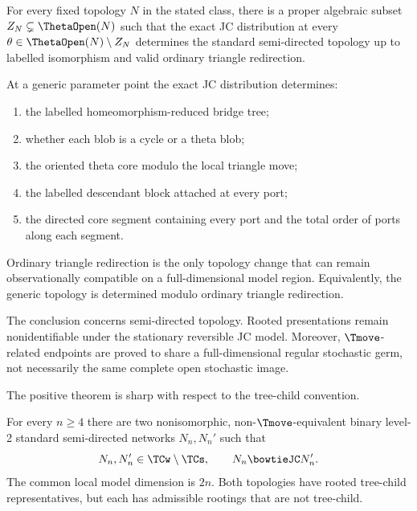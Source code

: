 \begin{corollary}\label{cor:generic-identifiability}
For every fixed topology $N$ in the stated class, there is a proper algebraic subset $Z_N\subsetneq\ThetaOpen(N)$ such that the exact JC distribution at every $\theta\in\ThetaOpen(N)\setminus Z_N$ determines the standard semi-directed topology up to labelled isomorphism and valid ordinary triangle redirection.
\end{corollary}

\begin{corollary}\label{cor:recoverable}
At a generic parameter point the exact JC distribution determines:
\begin{enumerate}[label=\textup{(\roman*)}]
\item the labelled homeomorphism-reduced bridge tree;
\item whether each blob is a cycle or a theta blob;
\item the oriented theta core modulo the local triangle move;
\item the labelled descendant block attached at every port;
\item the directed core segment containing every port and the total order of ports along each segment.
\end{enumerate}
Ordinary triangle redirection is the only topology change that can remain observationally compatible on a full-dimensional model region.  Equivalently, the generic topology is determined modulo ordinary triangle redirection.
\end{corollary}

The conclusion concerns semi-directed topology.  Rooted presentations remain nonidentifiable under the stationary reversible JC model.  Moreover, $\Tmove$-related endpoints are proved to share a full-dimensional regular stochastic germ, not necessarily the same complete open stochastic image.

The positive theorem is sharp with respect to the tree-child convention.

\begin{theorem}\label{thm:sharpness}
For every $n\ge4$ there are two nonisomorphic, non-$\Tmove$-equivalent binary level-2 standard semi-directed networks $N_n,N_n'$ such that
\[
N_n,N_n'\in\TCw\setminus\TCs,
\qquad
N_n\bowtieJC N_n'.
\]
The common local model dimension is $2n$.  Both topologies have rooted tree-child representatives, but each has admissible rootings that are not tree-child.
\end{theorem}

